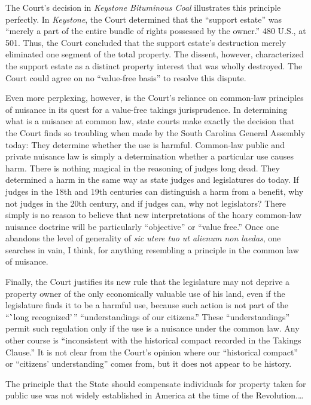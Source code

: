 The Court's decision in \textit{Keystone Bituminous Coal} illustrates this
principle perfectly. In \textit{Keystone}, the Court determined that the
``support estate'' was ``merely a part of the entire bundle of rights possessed
by the owner.'' 480 U.S., at 501. Thus, the Court concluded that the support
estate's destruction merely eliminated one segment of the total property. The
dissent, however, characterized the support estate as a distinct property
interest that was wholly destroyed. The Court could agree on no ``value-free
basis'' to resolve this dispute.

Even more perplexing, however, is the Court's reliance on common-law principles
of nuisance in its quest for a value-free takings jurisprudence. In determining
what is a nuisance at common law, state courts make exactly the decision that
the Court finds so troubling when made by the South Carolina General Assembly
today: They determine whether the use is harmful. Common-law public and private
nuisance law is simply a determination whether a particular use causes harm.
There is nothing magical in the reasoning of judges long dead. They determined a
harm in the same way as state judges and legislatures do today. If judges in the
18th and 19th centuries can distinguish a harm from a benefit, why not judges in
the 20th century, and if judges can, why not legislators? There simply is no
reason to believe that new interpretations of the hoary common-law nuisance
doctrine will be particularly ``objective'' or ``value free.'' Once one abandons
the level of generality of \textit{sic utere tuo ut alienum non laedas}, one
searches in vain, I think, for anything resembling a principle in the common law
of nuisance.

Finally, the Court justifies its new rule that the legislature may not deprive a
property owner of the only economically valuable use of his land, even if the
legislature finds it to be a harmful use, because such action is not part of the
``\``long recognized'\,'' ``understandings of our citizens.'' These
``understandings'' permit such regulation only if the use is a nuisance under
the common law. Any other course is ``inconsistent with the historical compact
recorded in the Takings Clause.'' It is not clear from the Court's opinion where
our ``historical compact'' or ``citizens' understanding'' comes from, but it
does not appear to be history.

The principle that the State should compensate individuals for property taken
for public use was not widely established in America at the time of the
Revolution.\ldots

